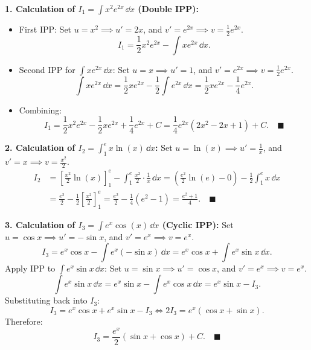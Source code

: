 \begin{solution}
\textbf{1. Calculation of $I_1 = \int x^2 e^{2x}\,\dd x$ (Double IPP):}
\begin{itemize}[leftmargin=1.5em,itemsep=1pt]
  \item First IPP: Set $u = x^2 \implies u' = 2x$, and $v' = e^{2x} \implies v = \frac{1}{2}e^{2x}$.
  \[
  I_1 = \frac{1}{2}x^2 e^{2x} - \int x e^{2x}\,\dd x.
  \]
  \item Second IPP for $\int x e^{2x}\,\dd x$: Set $u = x \implies u' = 1$, and $v' = e^{2x} \implies v = \frac{1}{2}e^{2x}$.
  \[
  \int x e^{2x}\,\dd x = \frac{1}{2}x e^{2x} - \frac{1}{2}\int e^{2x}\,\dd x = \frac{1}{2}x e^{2x} - \frac{1}{4}e^{2x}.
  \]
  \item Combining:
  \[
  I_1 = \frac{1}{2}x^2 e^{2x} - \frac{1}{2}x e^{2x} + \frac{1}{4}e^{2x} + C = \frac{1}{4}e^{2x}(2x^2 - 2x + 1) + C. \quad \blacksquare
  \]
\end{itemize}

\textbf{2. Calculation of $I_2 = \int_1^e x \ln(x)\,\dd x$:}
Set $u = \ln(x) \implies u' = \frac{1}{x}$, and $v' = x \implies v = \frac{x^2}{2}$.
\begin{align*}
I_2 &= \left[ \frac{x^2}{2}\ln(x) \right]_1^e - \int_1^e \frac{x^2}{2} \cdot \frac{1}{x}\,\dd x = \left( \frac{e^2}{2}\ln(e) - 0 \right) - \frac{1}{2}\int_1^e x\,\dd x \\
&= \frac{e^2}{2} - \frac{1}{2}\left[ \frac{x^2}{2} \right]_1^e = \frac{e^2}{2} - \frac{1}{4}(e^2 - 1) = \frac{e^2 + 1}{4}. \quad \blacksquare
\end{align*}

\textbf{3. Calculation of $I_3 = \int e^x \cos(x)\,\dd x$ (Cyclic IPP):}
Set $u = \cos x \implies u' = -\sin x$, and $v' = e^x \implies v = e^x$.
\[
I_3 = e^x \cos x - \int e^x (-\sin x)\,\dd x = e^x \cos x + \int e^x \sin x\,\dd x.
\]
Apply IPP to $\int e^x \sin x\,\dd x$: Set $u = \sin x \implies u' = \cos x$, and $v' = e^x \implies v = e^x$.
\[
\int e^x \sin x\,\dd x = e^x \sin x - \int e^x \cos x\,\dd x = e^x \sin x - I_3.
\]
Substituting back into $I_3$:
\[
I_3 = e^x \cos x + e^x \sin x - I_3 \iff 2I_3 = e^x(\cos x + \sin x).
\]
Therefore:
\[
I_3 = \frac{e^x}{2}(\sin x + \cos x) + C. \quad \blacksquare
\]
\end{solution}


